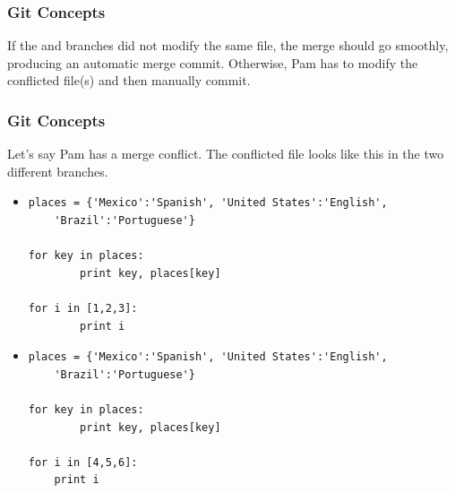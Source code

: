 \begin{frame}[c]\frametitle{Git Concepts}
	If the  and  branches
	did not modify the same file, the merge should go smoothly,
	producing an automatic merge commit.
	Otherwise, Pam has to modify the conflicted file(s)
	and then manually commit. 
\end{frame}

\begin{frame}[fragile]
    \frametitle{Git Concepts}
    Let's say Pam has a merge conflict. The conflicted file
    looks like this in the two different branches.

    \begin{itemize}
        \item {}

        \vspace{0.25cm}
        \newbox{\mybox}
        \begin{lrbox}{\mybox}
        \begin{minipage}{\linewidth}
        \begin{lstlisting}[basicstyle=\tiny\ttfamily\color{white}]
places = {'Mexico':'Spanish', 'United States':'English',
    'Brazil':'Portuguese'}

for key in places:
        print key, places[key]

for i in [1,2,3]:
        print i
        \end{lstlisting}
        \end{minipage}
        \end{lrbox}
        \colorbox{black}{\usebox{\mybox}}

        \vspace{0.25cm}
        \item {}

        \vspace{0.25cm}
        \newbox{\mybox}
        \begin{lrbox}{\mybox}
        \begin{minipage}{\linewidth}
        \begin{lstlisting}[basicstyle=\tiny\ttfamily\color{white}]
places = {'Mexico':'Spanish', 'United States':'English',
    'Brazil':'Portuguese'}

for key in places:
        print key, places[key]

for i in [4,5,6]:
    print i
        \end{lstlisting}
        \end{minipage}
        \end{lrbox}
        \colorbox{black}{\usebox{\mybox}}
        
    \end{itemize}

\end{frame}

